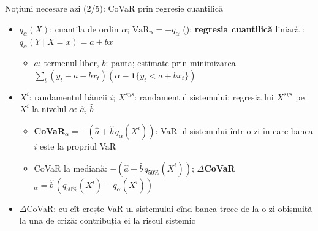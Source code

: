\begin{frame}{Noțiuni necesare azi (2/5): CoVaR prin regresie cuantilică}
\itemsize{\small}
\begin{itemize}
    \item $q_\alpha(X)$: cuantila de ordin $\alpha$; $\mathrm{VaR}_\alpha = -q_\alpha$ (); \textbf{regresia cuantilică} liniară : $q_\alpha(Y \mid X = x) = a + bx$
    \begin{itemize}
        \item $a$: termenul liber, $b$: panta; estimate prin minimizarea $\sum_t (y_t - a - bx_t)(\alpha - \mathbf{1}\{y_t < a + bx_t\})$
    \end{itemize}
    \item $X^i$: randamentul băncii $i$; $X^{sys}$: randamentul sistemului; regresia lui $X^{sys}$ pe $X^i$ la nivelul $\alpha$: $\hat a$, $\hat b$ 
    \begin{itemize}
        \item \textbf{CoVaR}$_\alpha = -(\hat a + \hat b\,q_\alpha(X^i))$: VaR-ul sistemului într-o zi în care banca $i$ este la propriul VaR
        \item CoVaR la mediană: $-(\hat a + \hat b\,q_{50\%}(X^i))$; \textbf{$\Delta$CoVaR}$_\alpha = \hat b\,(q_{50\%}(X^i) - q_\alpha(X^i))$
    \end{itemize}
    \item $\Delta$CoVaR: cu cît crește VaR-ul sistemului cînd banca trece de la o zi obișnuită la una de criză: contribuția ei la riscul sistemic
\end{itemize}
\end{frame}


